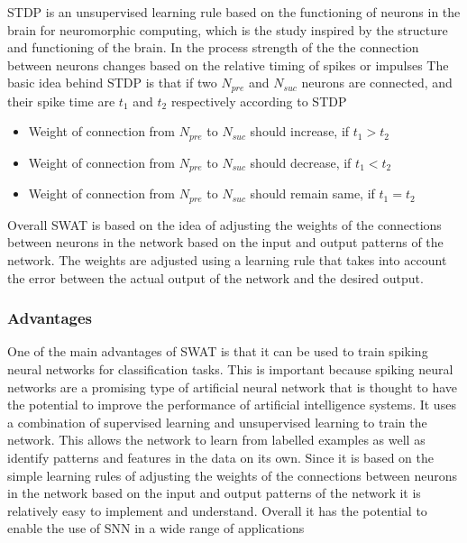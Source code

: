 STDP is an unsupervised learning rule based on the functioning of neurons in
the brain for neuromorphic computing, which is the study inspired by the
structure and functioning of the brain. In the process strength of the the
connection between neurons changes based on the relative timing of spikes or
impulses The basic idea behind STDP is that if two $N_{pre}$ and $N_{suc}$
neurons are connected, and their spike time are $t_1$ and $t_2$ respectively
according to STDP \vspace*{-.3pc}
\begin{itemize}
    \item[]Weight of connection from $N_{pre}$ to $N_{suc}$ should  increase, if {\boldmath$t_1>t_2$}
    \item[]Weight of connection from $N_{pre}$ to $N_{suc}$ should  decrease, if {\boldmath$t_1<t_2$}
    \item[]Weight of connection from $N_{pre}$ to $N_{suc}$ should  remain same, if {\boldmath$t_1=t_2$}

\end{itemize}

Overall SWAT is based on the idea of adjusting the weights of the connections
between neurons in the network based on the input and output patterns of the
network. The weights are adjusted using a learning rule that takes into account
the error between the actual output of the network and the desired output.
\subsubsection{Advantages}
One of the main advantages of SWAT is that it can be used to train spiking
neural networks for classification tasks. This is important because spiking
neural networks are a promising type of artificial neural network that is
thought to have the potential to improve the performance of artificial
intelligence systems. It uses a combination of supervised learning and
unsupervised learning to train the network. This allows the network to learn
from labelled examples as well as identify patterns and features in the data on
its own. Since it is based on the simple learning rules of adjusting the
weights of the connections between neurons in the network based on the input
and output patterns of the network it is relatively easy to implement and
understand. Overall it has the potential to enable the use of SNN in a wide
range of applications
